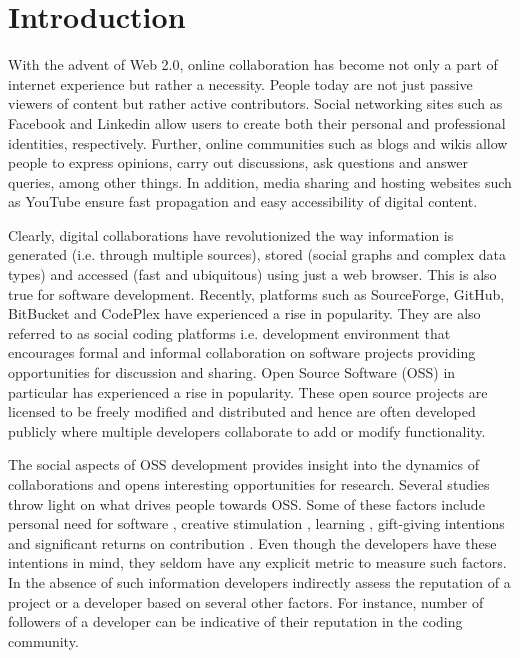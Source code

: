 
\section{Introduction}
\label{sec:introduction}

With the advent of Web 2.0, online collaboration has become not only a part of internet experience but rather a necessity. People today are not just passive viewers of content but rather active contributors. Social networking sites such as Facebook and Linkedin allow users to create both their personal and professional identities, respectively. Further, online communities such as blogs and wikis allow people to express opinions, carry out discussions, ask questions and answer queries, among other things. In addition, media sharing and hosting websites such as YouTube ensure fast propagation and easy accessibility of digital content.

Clearly, digital collaborations have revolutionized the way information is generated (i.e. through multiple sources), stored (social graphs and complex data types) and accessed (fast and ubiquitous) using just a web browser. This is also true for software development. Recently, platforms such as SourceForge, GitHub, BitBucket and CodePlex have experienced a rise in popularity. They are also referred to as social coding platforms i.e. development environment that encourages formal and informal collaboration on software projects providing opportunities for discussion and sharing. Open Source Software (OSS) in particular has experienced a rise in popularity. These open source projects are licensed to be freely modified and distributed and hence are often developed publicly where multiple developers collaborate to add or modify functionality.

The social aspects of OSS development provides insight into the dynamics of collaborations and opens interesting opportunities for research. Several studies throw light on what drives people towards OSS. Some of these factors include personal need for software \cite{Raymond1999}, creative stimulation \cite{lakhani2005}, learning \cite{Lakhani2003}, gift-giving intentions \cite{Zeitlyn2003} and significant returns on contribution \cite{ghosh2005}. Even though the developers have these intentions in mind, they seldom have any explicit metric to measure such factors. In the absence of such information developers indirectly assess the reputation of a project or a developer based on several other factors. For instance, number of followers of a developer can be indicative of their reputation in the coding community.

